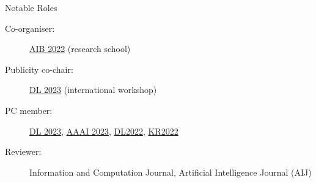 %

\begin{rSection}{Notable Roles}
    \begin{description}
        \item[Co-organiser:] \href{https://researchschool.w.uib.no/}{AIB 2022} (research school) 
        \item[Publicity co-chair:] \href{https://dl2023.w.uib.no/}{DL 2023} (international workshop)
        \item[PC member:]   \href{https://dl2023.w.uib.no/}{DL 2023}, \href{https://aaai.org/Conferences/AAAI-23/}{AAAI 2023}, \href{http://dl.kr.org/dl2022}{DL2022}, \href{https://kr2022.cs.tu-dortmund.de/}{KR2022}
        \item[Reviewer:] Information and Computation Journal, Artificial Intelligence Journal (AIJ)
    \end{description} 
\end{rSection}
